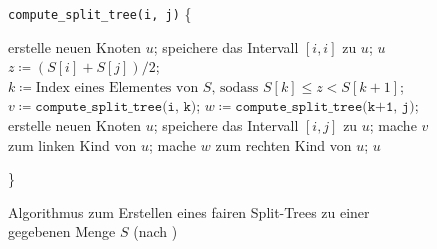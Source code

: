 \begin{figure}
	\centering
	\begin{minipage}{.8\linewidth}
		\scriptsize
		\begin{algorithmic}[H]
			\STATE \texttt{compute\_split\_tree(i, j)}  \{
			\begin{ALC@g}
					\STATE erstelle neuen Knoten $u$;
					\STATE speichere das Intervall $[i,i]$ zu $u$;
					\RETURN $u$
				\ELSE
					\STATE $z \coloneqq (S[i] + S[j]) / 2$;
					\STATE $k \coloneqq \text{Index eines Elementes von } S \text{, sodass } S[k] \leq z < S[k+1]$;
					\STATE $v \coloneqq \texttt{compute\_split\_tree(i, k)}$;
					\STATE $w \coloneqq \texttt{compute\_split\_tree(k+1, j)}$;
					\STATE erstelle neuen Knoten $u$;
					\STATE speichere das Intervall $[i, j]$ zu $u$;
					\STATE mache $v$ zum linken Kind von $u$;
					\STATE mache $w$ zum rechten Kind von $u$;
					\RETURN $u$
				\ENDIF
			\end{ALC@g}
			\STATE \}
		\end{algorithmic}
	\end{minipage}
	\caption{Algorithmus zum Erstellen eines fairen Split-Trees zu einer gegebenen Menge $S$ (nach \cite{gudmundsson})}
	\label{fig:splittree}
\end{figure}

